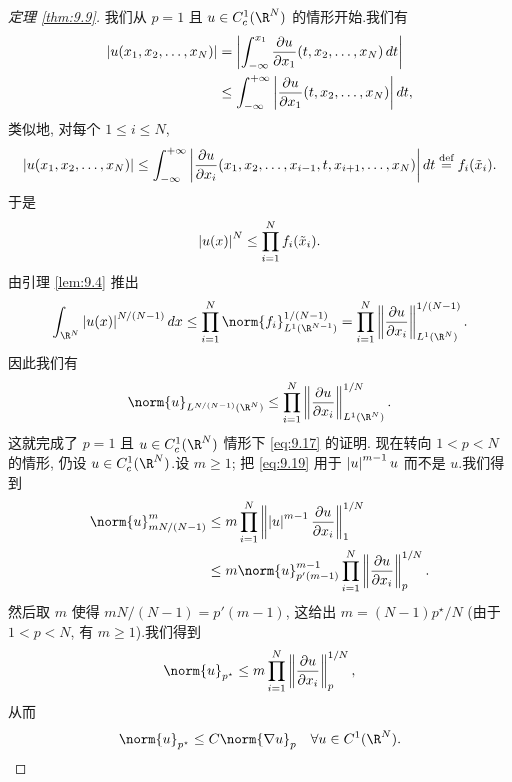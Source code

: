 \begin{proof}[定理 \ref{thm:9.9}]
我们从 $p=1$ 且 $u\in C_c^1(\R^N)$ 的情形开始.我们有
\begin{align*}
\left|u(x_1,x_2,\dots,x_N)\right|
&=\left|\int_{-\infty}^{x_1}\frac{\partial u}{\partial x_1}
(t,x_2,\dots,x_N)\,dt\right|\\
&\le\int_{-\infty}^{+\infty}\left|\frac{\partial u}{\partial x_1}
(t,x_2,\dots,x_N)\right|dt,
\end{align*}
类似地, 对每个 $1\le i\le N$,
\begin{equation*}
\left|u(x_1,x_2,\dots,x_N)\right|\le\int_{-\infty}^{+\infty}
\left|\frac{\partial u}{\partial x_i}(x_1,x_2,\dots,x_{i-1},t,
x_{i+1},\dots,x_N)\right|dt
\overset{\text{def}}{=}f_i(\tilde x_i).
\end{equation*}
于是
\begin{equation*}
\left|u(x)\right|^N\le\prod_{i=1}^Nf_i(\tilde x_i).
\end{equation*}
由引理  \ref{lem:9.4} 推出
\begin{equation*}
\int_{\R^N}\abs{u(x)}^{N/(N-1)}dx\le\prod_{i=1}^N
\norm{f_i}_{L^1(\R^{N-1})}^{1/(N-1)}
=\prod_{i=1}^N\left\|\frac{\partial u}{\partial x_i}\right\|_{L^1(\R^N)}^{1/(N-1)}.
\end{equation*}
因此我们有
\begin{equation}
\norm{u}_{L^{N/(N-1)}(\R^N)}\le\prod_{i=1}^N
\left\|\frac{\partial u}{\partial x_i}\right\|_{L^1(\R^N)}^{1/N}.
\label{eq:9.19}
\end{equation}
这就完成了 $p=1$ 且 $u\in C_c^1(\R^N)$ 情形下 \eqref{eq:9.17} 的证明.
现在转向 $1<p<N$ 的情形, 仍设 $u\in C_c^1(\R^N)$.设 $m\ge1$; 把
\eqref{eq:9.19} 用于 $\left|u\right|^{m-1}u$ 而不是 $u$.我们得到
\begin{align}
\norm{u}_{mN/(N-1)}^m
&\le m\prod_{i=1}^N\left\|\abs{u}^{m-1}
\frac{\partial u}{\partial x_i}\right\|_1^{1/N}\notag\\
&\le m\norm{u}_{p'(m-1)}^{m-1}\prod_{i=1}^N
\left\|\frac{\partial u}{\partial x_i}\right\|_p^{1/N}.
\label{eq:9.20}
\end{align}
然后取 $m$ 使得 $mN/(N-1)=p'(m-1)$, 这给出
$m=(N-1)p^\star/N$ (由于 $1<p<N$, 有 $m\ge1$).我们得到
\begin{equation*}
\norm{u}_{p^\star}\le m\prod_{i=1}^N
\left\|\frac{\partial u}{\partial x_i}\right\|_p^{1/N},
\end{equation*}
从而
\begin{equation*}
\norm{u}_{p^\star}\le C\norm{\nabla u}_p\quad\forall u\in C^1(\R^N).
\end{equation*}

\end{proof}
